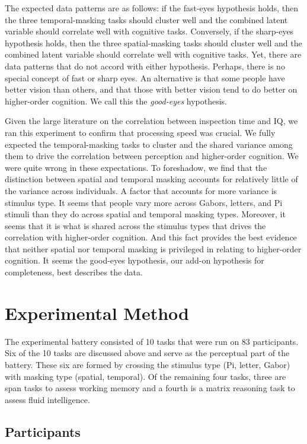 \documentclass[
  ,man]{apa6}
\begin{document}
The expected data patterns are as follows: if the fast-eyes hypothesis holds, then the three temporal-masking tasks should cluster well and the combined latent variable should correlate well with cognitive tasks. Conversely, if the sharp-eyes hypothesis holds, then the three spatial-masking tasks should cluster well and the combined latent variable should correlate well with cognitive tasks. Yet, there are data patterns that do not accord with either hypothesis. Perhaps, there is no special concept of fast or sharp eyes. An alternative is that some people have better vision than others, and that those with better vision tend to do better on higher-order cognition. We call this the \emph{good-eyes} hypothesis.

Given the large literature on the correlation between inspection time and IQ, we ran this experiment to confirm that processing speed was crucial. We fully expected the temporal-masking tasks to cluster and the shared variance among them to drive the correlation between perception and higher-order cognition. We were quite wrong in these expectations. To foreshadow, we find that the distinction between spatial and temporal masking accounts for relatively little of the variance across individuals. A factor that accounts for more variance is stimulus type. It seems that people vary more across Gabors, letters, and Pi stimuli than they do across spatial and temporal masking types. Moreover, it seems that it is what is shared across the stimulus types that drives the correlation with higher-order cognition. And this fact provides the best evidence that neither spatial nor temporal masking is privileged in relating to higher-order cognition. It seems the good-eyes hypothesis, our add-on hypothesis for completeness, best describes the data.

\section{Experimental Method}\label{experimental-method}

The experimental battery consisted of 10 tasks that were run on 83 participants. Six of the 10 tasks are discussed above and serve as the perceptual part of the battery. These six are formed by crossing the stimulus type (Pi, letter, Gabor) with masking type (spatial, temporal). Of the remaining four tasks, three are span tasks to assess working memory and a fourth is a matrix reasoning task to assess fluid intelligence.

\subsection{Participants}\label{participants}
\end{document}
